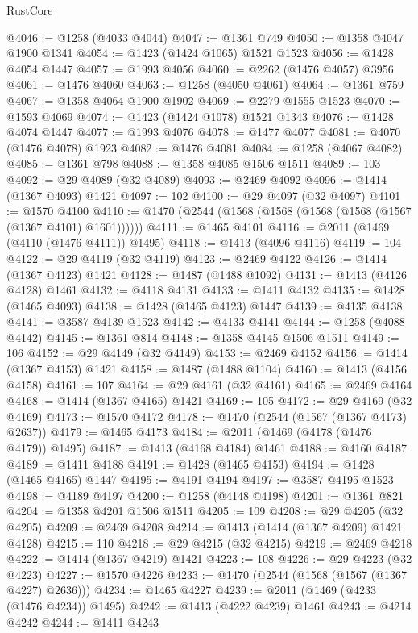 \begin{lexlean}{RustCore}
\begin{coremodule}
@4046 := @1258 (@4033 @4044)
@4047 := @1361 @749
@4050 := @1358 @4047 @1900 @1341
@4054 := @1423 (@1424 @1065) @1521 @1523
@4056 := @1428 @4054 @1447
@4057 := @1993 @4056
@4060 := @2262 (@1476 @4057) @3956
@4061 := @1476 @4060
@4063 := @1258 (@4050 @4061)
@4064 := @1361 @759
@4067 := @1358 @4064 @1900 @1902
@4069 := @2279 @1555 @1523
@4070 := @1593 @4069
@4074 := @1423 (@1424 @1078) @1521 @1343
@4076 := @1428 @4074 @1447
@4077 := @1993 @4076
@4078 := @1477 @4077
@4081 := @4070 (@1476 @4078) @1923
@4082 := @1476 @4081
@4084 := @1258 (@4067 @4082)
@4085 := @1361 @798
@4088 := @1358 @4085 @1506 @1511
@4089 := 103
@4092 := @29 @4089 (@32 @4089)
@4093 := @2469 @4092
@4096 := @1414 (@1367 @4093) @1421
@4097 := 102
@4100 := @29 @4097 (@32 @4097)
@4101 := @1570 @4100
@4110 := @1470 (@2544 (@1568 (@1568 (@1568 (@1568 (@1567 (@1367 @4101) @1601))))))
@4111 := @1465 @4101
@4116 := @2011 (@1469 (@4110 (@1476 @4111)) @1495)
@4118 := @1413 (@4096 @4116)
@4119 := 104
@4122 := @29 @4119 (@32 @4119)
@4123 := @2469 @4122
@4126 := @1414 (@1367 @4123) @1421
@4128 := @1487 (@1488 @1092)
@4131 := @1413 (@4126 @4128) @1461
@4132 := @4118 @4131
@4133 := @1411 @4132
@4135 := @1428 (@1465 @4093)
@4138 := @1428 (@1465 @4123) @1447
@4139 := @4135 @4138
@4141 := @3587 @4139 @1523
@4142 := @4133 @4141
@4144 := @1258 (@4088 @4142)
@4145 := @1361 @814
@4148 := @1358 @4145 @1506 @1511
@4149 := 106
@4152 := @29 @4149 (@32 @4149)
@4153 := @2469 @4152
@4156 := @1414 (@1367 @4153) @1421
@4158 := @1487 (@1488 @1104)
@4160 := @1413 (@4156 @4158)
@4161 := 107
@4164 := @29 @4161 (@32 @4161)
@4165 := @2469 @4164
@4168 := @1414 (@1367 @4165) @1421
@4169 := 105
@4172 := @29 @4169 (@32 @4169)
@4173 := @1570 @4172
@4178 := @1470 (@2544 (@1567 (@1367 @4173) @2637))
@4179 := @1465 @4173
@4184 := @2011 (@1469 (@4178 (@1476 @4179)) @1495)
@4187 := @1413 (@4168 @4184) @1461
@4188 := @4160 @4187
@4189 := @1411 @4188
@4191 := @1428 (@1465 @4153)
@4194 := @1428 (@1465 @4165) @1447
@4195 := @4191 @4194
@4197 := @3587 @4195 @1523
@4198 := @4189 @4197
@4200 := @1258 (@4148 @4198)
@4201 := @1361 @821
@4204 := @1358 @4201 @1506 @1511
@4205 := 109
@4208 := @29 @4205 (@32 @4205)
@4209 := @2469 @4208
@4214 := @1413 (@1414 (@1367 @4209) @1421 @4128)
@4215 := 110
@4218 := @29 @4215 (@32 @4215)
@4219 := @2469 @4218
@4222 := @1414 (@1367 @4219) @1421
@4223 := 108
@4226 := @29 @4223 (@32 @4223)
@4227 := @1570 @4226
@4233 := @1470 (@2544 (@1568 (@1567 (@1367 @4227) @2636)))
@4234 := @1465 @4227
@4239 := @2011 (@1469 (@4233 (@1476 @4234)) @1495)
@4242 := @1413 (@4222 @4239) @1461
@4243 := @4214 @4242
@4244 := @1411 @4243

\end{coremodule}
\end{lexlean}

